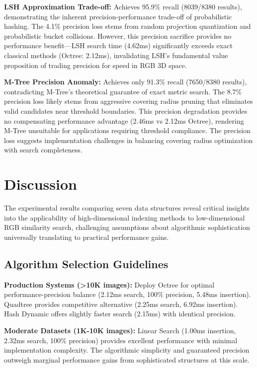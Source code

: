 \documentclass{sbc2023}
\begin{document}
\textbf{LSH Approximation Trade-off:} Achieves 95.9\% recall (8039/8380 results), demonstrating the inherent precision-performance trade-off of probabilistic hashing. The 4.1\% precision loss stems from random projection quantization and probabilistic bucket collisions. However, this precision sacrifice provides no performance benefit—LSH search time (4.62ms) significantly exceeds exact classical methods (Octree: 2.12ms), invalidating LSH's fundamental value proposition of trading precision for speed in RGB 3D space.

\textbf{M-Tree Precision Anomaly:} Achieves only 91.3\% recall (7650/8380 results), contradicting M-Tree's theoretical guarantee of exact metric search. The 8.7\% precision loss likely stems from aggressive covering radius pruning that eliminates valid candidates near threshold boundaries. This precision degradation provides no compensating performance advantage (2.46ms vs 2.12ms Octree), rendering M-Tree unsuitable for applications requiring threshold compliance. The precision loss suggests implementation challenges in balancing covering radius optimization with search completeness.


\section{Discussion}
\label{sec:discussion}

The experimental results comparing seven data structures reveal critical insights into the applicability of high-dimensional indexing methods to low-dimensional RGB similarity search, challenging assumptions about algorithmic sophistication universally translating to practical performance gains.

\subsection{Algorithm Selection Guidelines}

\textbf{Production Systems (>10K images):} Deploy Octree for optimal performance-precision balance (2.12ms search, 100\% precision, 5.48ms insertion). Quadtree provides competitive alternative (2.25ms search, 6.92ms insertion). Hash Dynamic offers slightly faster search (2.15ms) with identical precision.

\textbf{Moderate Datasets (1K-10K images):} Linear Search (1.00ms insertion, 2.32ms search, 100\% precision) provides excellent performance with minimal implementation complexity. The algorithmic simplicity and guaranteed precision outweigh marginal performance gains from sophisticated structures at this scale.
\end{document}
